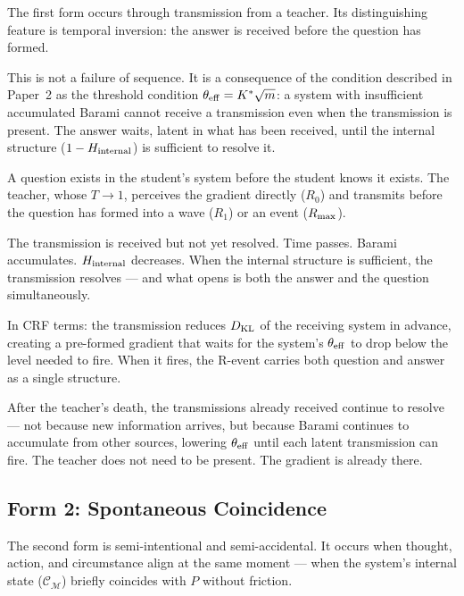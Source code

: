 \documentclass[12pt, a4paper]{article}
\begin{document}
The first form occurs through transmission from a teacher. Its distinguishing
feature is temporal inversion: the answer is received before the question has
formed.

This is not a failure of sequence. It is a consequence of the condition described
in Paper~2 as the threshold condition $\theta_{\rm eff} = K^*\sqrt{m}$: a system
with insufficient accumulated Barami cannot receive a transmission even when the
transmission is present. The answer waits, latent in what has been received, until
the internal structure ($1 - H_{\rm internal}$) is sufficient to resolve it.

\begin{formalbox}[title={Form 1: Transmission Before Comprehension}]
A question exists in the student's system before the student knows it exists.
The teacher, whose $T \to 1$, perceives the gradient directly ($R_0$) and
transmits before the question has formed into a wave ($R_1$) or an event
($R_{\rm max}$).

The transmission is received but not yet resolved. Time passes. Barami accumulates.
$H_{\rm internal}$ decreases. When the internal structure is sufficient, the
transmission resolves --- and what opens is both the answer and the question
simultaneously.

In CRF terms: the transmission reduces $D_{\rm KL}$ of the receiving system
in advance, creating a pre-formed gradient that waits for the system's
$\theta_{\rm eff}$ to drop below the level needed to fire.
When it fires, the R-event carries both question and answer as a single structure.
\end{formalbox}

After the teacher's death, the transmissions already received continue to resolve ---
not because new information arrives, but because Barami continues to accumulate
from other sources, lowering $\theta_{\rm eff}$ until each latent transmission
can fire. The teacher does not need to be present. The gradient is already there.

\subsection{Form 2: Spontaneous Coincidence}

The second form is semi-intentional and semi-accidental. It occurs when thought,
action, and circumstance align at the same moment --- when the system's internal
state ($\mathcal{C}_\mathcal{M}$) briefly coincides with $P$ without friction.
\end{document}
